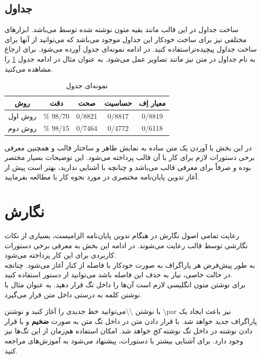 \subsection{جداول}
ساخت جداول در این قالب مانند بقیه متون نوشته شده توسط  می‌باشد. ابزارهای مختلفی نیز برای ساخت خودکار این جداول موجود می‌باشد که می‌توانید از آنها  برای ساخت جداول پیچیده‌تراستفاده کنید. در ادامه نمونه‌ای جدول آورده می‌شود. برای ارجاع به نام جداول در متن نیز مانند تصاویر عمل می‌شود. به عنوان مثال در ادامه جدول \ref{tab:tch} را مشاهده می‌کنید.

\begin{table}[h]
	\begin{center}
		\caption{نمونه‌ای جدول}
		\begin{tabular}{|c|c|c|c|c|}
			\hline
			روش & 
			دقت & صحت & حساسیت & معیار اِف \\
			\hline
			
			روش اول & 
			\% 98/70 & 0/8821 & 0/8817 & 0/8819 \\
			\hline
			
			روش دوم & 
			\% 98/15 & 0/7464 & 0/4772 & 0/6118 \\
			\hline
		\end{tabular}
		\label{tab:tch}
	\end{center}
\end{table}

در این بخش با آوردن یک متن ساده به نمایش ظاهر و ساختار قالب و همچنین معرفی برخی دستورات لازم برای کار با آن قالب پرداخته می‌شود. این توضیحات بسیار مختصر بوده و صرفاً برای معرفی قالب می‌باشد و چنانچه با  آشنایی ندارید، بهتر است پیش از آغاز تدوین پایان‌نامه مختصری در مورد نحوه کار با  مطالعه بفرمایید.
\section{نگارش}
رعایت تمامی اصول نگارش در هنگام تدوین پایان‌نامه الزامیست، بسیاری از نکات نگارشی توسط قالب رعایت می‌شوند. در ادامه این بخش به معرفی برخی دستورات کاربردی برای این کار پرداخته می‌شود.
\\
به طور پیش‌‌فرض هر پاراگراف به صورت خودکار با فاصله  از کنار آغاز می‌شود.  چنانچه در حالت خاصی، نیاز به حذف این فاصله باشد می‌توانید از دستور 
 \RTL{}\noindent
استفاده کنید.\\
برای نوشتن متون انگلیسی لازم است آن‌ها را داخل تگ
 قرار دهید. به عنوان مثال با نوشتن 
 کلمه  به درستی داخل متن قرار می‌گیرد.
 \par
 با نوشتن \textbackslash\textbackslash می‌توانید خط جدیدی را آغاز کنید و نوشتن \textbackslash par نیز باعث ایجاد یک پاراگراف جدید خواهد شد. با قرار دادن متن در داخل تگ  متن به صورت \textbf{ضخیم} و با قرار دادن نوشته در داخل تگ  نوشته \textit{کج} خواهد شد. امکان استفاده هم‌زمان از این تگ‌ها نیز وجود دارد. برای آشنایی بیشتر با دستورات، پیشنهاد می‌شود به آموزش‌های  مراجعه کنید.
 \par

